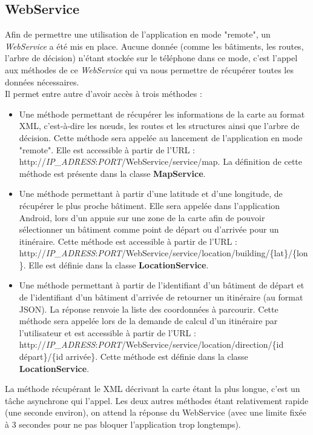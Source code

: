 \documentclass[12pt,a4paper,oneside]{article}
\begin{document}
\subsection{WebService}
Afin de permettre une utilisation de l'application en mode "remote", un \textit{WebService} a été mis en place. Aucune donnée (comme les bâtiments, les routes, l'arbre de décision) n'étant stockée sur le téléphone dans ce mode, c'est l'appel aux méthodes de ce \textit{WebService} qui va nous permettre de récupérer toutes les données nécessaires. \\
Il permet entre autre d'avoir accès à trois méthodes :\\
\begin{itemize}
\item Une méthode permettant de récupérer les informations de la carte au format XML, c'est-à-dire les nœuds, les routes et les structures ainsi que l'arbre de décision. Cette méthode sera appelée au lancement de l'application en mode "remote". Elle est accessible à partir de l'URL : http://\textit{IP\_ADRESS}:\textit{PORT}/WebService/service/map. La définition de cette méthode est présente dans la classe \textbf{MapService}.
\item Une méthode permettant à partir d'une latitude et d'une longitude, de récupérer le plus proche bâtiment. Elle sera appelée dans l'application Android, lors d'un appuie sur une zone de la carte afin de pouvoir sélectionner un bâtiment comme point de départ ou d'arrivée pour un itinéraire. Cette méthode est accessible à partir de l'URL : http://\textit{IP\_ADRESS}:\textit{PORT}/WebService/service/location/building/\{lat\}/\{lon\}. Elle est définie dans la classe \textbf{LocationService}.
\item Une méthode permettant à partir de l'identifiant d'un bâtiment de départ et de l'identifiant d'un bâtiment d'arrivée de retourner un itinéraire (au format JSON). La réponse renvoie la liste des coordonnées à parcourir. Cette méthode sera appelée lors de la demande de calcul d'un itinéraire par l'utilisateur et est accessible à partir de l'URL : http://\textit{IP\_ADRESS}:\textit{PORT}/WebService/service/location/direction/\{id départ\}/\{id arrivée\}. Cette méthode est définie dans la classe \textbf{LocationService}.\\
\end{itemize}

La méthode récupérant le XML décrivant la carte étant la plus longue, c'est un tâche asynchrone qui l'appel. Les deux autres méthodes étant relativement rapide (une seconde environ), on attend la réponse du WebService (avec une limite fixée à 3 secondes pour ne pas bloquer l'application trop longtemps). 
\end{document}

